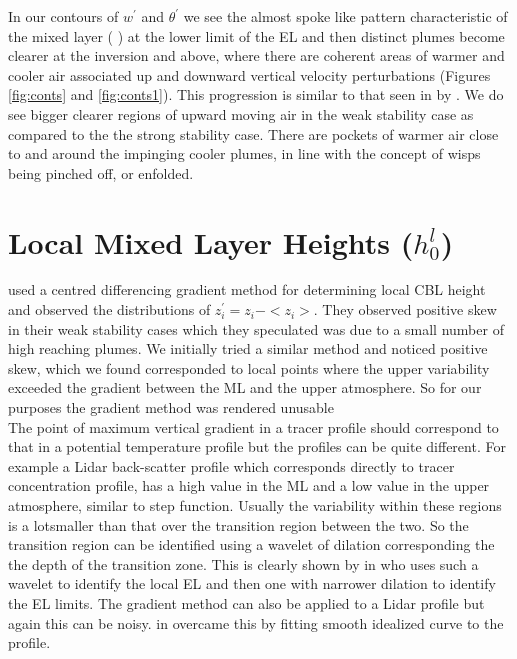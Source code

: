 In our contours of $w^{'}$ and $\theta^{'}$ we see the almost spoke like pattern characteristic of the
mixed layer (\citeauthor{SchmidtSchu} \cite{SchmidtSchu}) at the lower limit of the \acs{EL}
and then distinct plumes become clearer at the inversion and above, where there are coherent
areas of warmer and cooler air associated up and downward vertical velocity perturbations (Figures \ref{fig:conts} and \ref{fig:conts1}).  
This progression is similar to that seen in \cite{GarciaMellado} by \citeauthor{GarciaMellado}.  
We do see bigger clearer regions of upward moving air in the weak stability case as compared to the
the strong stability case. There are pockets of warmer air close to and around the impinging cooler plumes, in line with the concept of wisps being pinched off, or enfolded.



\section{Local Mixed Layer Heights ($h_{0}^{l}$)}
\label{sec:locmlh}     
\FloatBarrier


\citeauthor{SullMoengStev} \cite{SullMoengStev} used a centred differencing gradient method for determining local \acs{CBL} height  and observed the distributions
of $z_{i}^{'} = z_{i}-<z_{i}>$.  They observed positive skew in their weak stability cases which
they speculated was due to a small number of high reaching plumes.  We initially tried a similar
method and noticed positive skew, which we found corresponded to local points where the upper variability
exceeded the gradient between the \acs{ML} and the upper atmosphere. So for our purposes the gradient method was rendered unusable\\

The point of maximum vertical gradient in  a tracer profile should correspond to that in a potential 
temperature profile but the profiles can be quite different.  For example a Lidar back-scatter profile
which corresponds directly to tracer concentration profile, has a high value in the \acs{ML} and a low
value in the upper atmosphere, similar to step function.  Usually the variability within these regions 
is a lotsmaller than that over the transition region between the two.  So the transition region can be 
identified using a wavelet of dilation corresponding the the depth of the transition zone.  This is 
clearly shown by \citeauthor{Brooks} in \cite{Brooks} who uses such a wavelet to identify the local \acs{EL}
and then one with narrower dilation to identify the \acs{EL} limits.  The gradient method can also be applied
to a Lidar profile but again this can be noisy. %
\citeauthor{SteynBaldHoff}
in \cite{SteynBaldHoff} overcame this by fitting smooth idealized curve to the profile.\\

